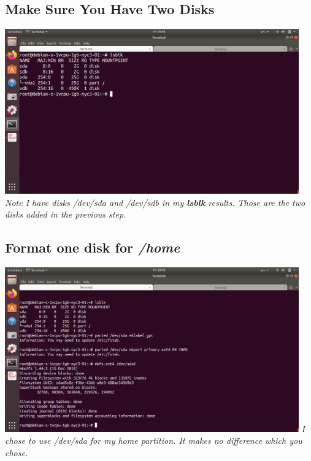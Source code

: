 \documentclass[10pt]{article}
\begin{document}
\subsection{Make Sure You Have Two Disks}
\begin{center}
    \includegraphics[width=0.95\textwidth]{Images/03_haveTwoDisks.png}
	\textit{Note I have disks /dev/sda and /dev/sdb in my \textbf{lsblk}
results. Those are the two disks added in the previous step.}
\end{center}

\subsection{Format one disk for \textit{/home}}
\begin{center}
    \includegraphics[width=0.95\textwidth]{Images/04_formattedDiskForHome.png}
	\textit{I chose to use /dev/sda for my home partition. It makes no difference
which you chose.}
\end{center}
\end{document}
